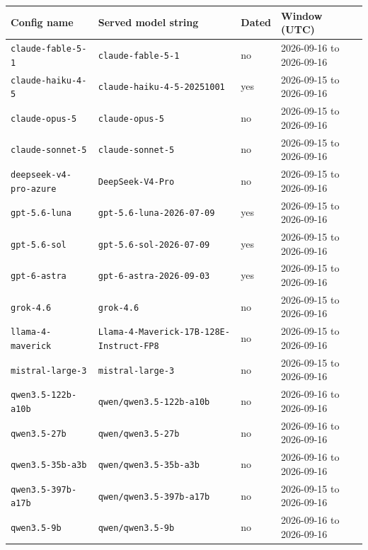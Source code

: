\begin{tabular}{llll}
\toprule
Config name & Served model string & Dated & Window (UTC) \\
\midrule
\texttt{claude-fable-5-1} & \texttt{claude-fable-5-1} & no & 2026-09-16 to 2026-09-16 \\
\texttt{claude-haiku-4-5} & \texttt{claude-haiku-4-5-20251001} & yes & 2026-09-15 to 2026-09-16 \\
\texttt{claude-opus-5} & \texttt{claude-opus-5} & no & 2026-09-15 to 2026-09-16 \\
\texttt{claude-sonnet-5} & \texttt{claude-sonnet-5} & no & 2026-09-15 to 2026-09-16 \\
\texttt{deepseek-v4-pro-azure} & \texttt{DeepSeek-V4-Pro} & no & 2026-09-15 to 2026-09-16 \\
\texttt{gpt-5.6-luna} & \texttt{gpt-5.6-luna-2026-07-09} & yes & 2026-09-15 to 2026-09-16 \\
\texttt{gpt-5.6-sol} & \texttt{gpt-5.6-sol-2026-07-09} & yes & 2026-09-15 to 2026-09-16 \\
\texttt{gpt-6-astra} & \texttt{gpt-6-astra-2026-09-03} & yes & 2026-09-15 to 2026-09-16 \\
\texttt{grok-4.6} & \texttt{grok-4.6} & no & 2026-09-15 to 2026-09-16 \\
\texttt{llama-4-maverick} & \texttt{Llama-4-Maverick-17B-128E-Instruct-FP8} & no & 2026-09-15 to 2026-09-16 \\
\texttt{mistral-large-3} & \texttt{mistral-large-3} & no & 2026-09-15 to 2026-09-16 \\
\texttt{qwen3.5-122b-a10b} & \texttt{qwen/qwen3.5-122b-a10b} & no & 2026-09-16 to 2026-09-16 \\
\texttt{qwen3.5-27b} & \texttt{qwen/qwen3.5-27b} & no & 2026-09-16 to 2026-09-16 \\
\texttt{qwen3.5-35b-a3b} & \texttt{qwen/qwen3.5-35b-a3b} & no & 2026-09-16 to 2026-09-16 \\
\texttt{qwen3.5-397b-a17b} & \texttt{qwen/qwen3.5-397b-a17b} & no & 2026-09-15 to 2026-09-16 \\
\texttt{qwen3.5-9b} & \texttt{qwen/qwen3.5-9b} & no & 2026-09-16 to 2026-09-16 \\
\bottomrule
\end{tabular}
